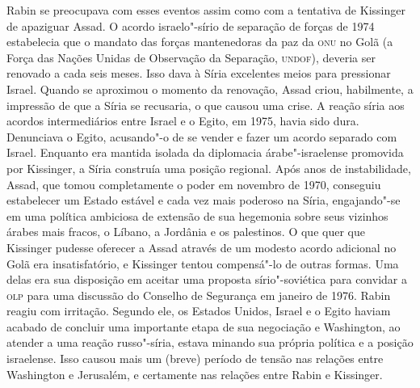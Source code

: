 Rabin se preocupava com esses eventos assim como com a tentativa de
Kissinger de apaziguar Assad. O acordo israelo"-sírio de separação de
forças de 1974 estabelecia que o mandato das forças mantenedoras da paz
da \textsc{onu} no Golã (a Força das Nações Unidas de Observação da Separação, \textsc{undof}), deveria ser renovado a cada seis meses. Isso
dava à Síria excelentes meios para pressionar Israel. Quando se
aproximou o momento da renovação, Assad criou, habilmente, a impressão
de que a Síria se recusaria, o que causou uma crise. A reação síria
aos acordos intermediários entre Israel e o Egito, em 1975, havia sido
dura. Denunciava o Egito, acusando"-o de se vender e fazer um acordo
separado com Israel. Enquanto era mantida isolada da diplomacia
árabe"-israelense promovida por Kissinger, a Síria construía uma posição
regional. Após anos de instabilidade, Assad, que tomou completamente o
poder em novembro de 1970, conseguiu estabelecer um Estado estável e
cada vez mais poderoso na Síria, engajando"-se em uma política ambiciosa
de extensão de sua hegemonia sobre seus vizinhos árabes mais fracos, o
Líbano, a Jordânia e os palestinos. O que quer que Kissinger pudesse
oferecer a Assad através de um modesto acordo adicional no Golã era
insatisfatório, e Kissinger tentou compensá"-lo de outras formas. Uma
delas era sua disposição em aceitar uma proposta sírio"-soviética para
convidar a \textsc{olp} para uma discussão do Conselho de Segurança em janeiro de
1976. Rabin reagiu com irritação. Segundo ele, os Estados Unidos, Israel
e o Egito haviam acabado de concluir uma importante etapa de sua
negociação e Washington, ao atender a uma reação russo"-síria, estava
minando sua própria política e a posição israelense. Isso causou mais um
(breve) período de tensão nas relações entre Washington e Jerusalém, e
certamente nas relações entre Rabin e Kissinger.


